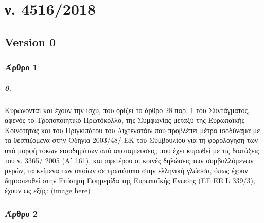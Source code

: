 \documentclass[a4paper,oneside, 10pt]{book}
\begin{document}
\chapter*{ ν. 4516/2018 }\section* { Version  0 } 
\subsection*{ Άρθρο 1 }
\paragraph { 0. }  Κυρώνονται και έχουν την ισχύ, που ορίζει το άρθρο 28 παρ. 1 του Συντάγματος, αφενός το Τροποποιητικό Πρωτόκολλο, της Συμφωνίας μεταξύ της Ευρωπαϊκής Κοινότητας και του Πριγκιπάτου του Λιχτενστάιν που προβλέπει μέτρα ισοδύναμα με τα θεσπιζόμενα στην Οδηγία 2003/48/ ΕΚ του Συμβουλίου για τη φορολόγηση των υπό μορφή τόκων εισοδημάτων από αποταμιεύσεις, που έχει κυρωθεί με τις διατάξεις του ν. 3365/ 2005 (Α΄ 161), και αφετέρου οι κοινές δηλώσεις των συμβαλλόμενων μερών, τα κείμενα των οποίων σε πρωτότυπο στην ελληνική γλώσσα, όπως έχουν δημοσιευθεί στην Επίσημη Εφημερίδα της Ευρωπαϊκής Ένωσης (ΕΕ ΕΕ L 339/3), έχουν ως εξής: (image here)   
\subsection*{ Άρθρο 2 }
\end{document}
